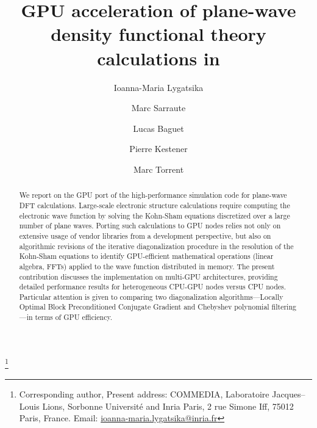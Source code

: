 \documentclass[twocolumn,superscriptaddress]{revtex4-1}
\begin{document}
\title{GPU acceleration of plane-wave density functional theory calculations in \abinit}

\author{Ioanna-Maria Lygatsika}
\thanks{Corresponding author, Present address: COMMEDIA, Laboratoire Jacques–Louis Lions, Sorbonne Universit\'e and Inria Paris, 2 rue Simone Iff, 75012
Paris, France. Email: \href{mailto:ioanna-maria.lygatsika@inria.fr}{ioanna-maria.lygatsika@inria.fr}}

\author{Marc Sarraute}

\author{Lucas Baguet}

\author{Pierre Kestener}

\author{Marc Torrent}

\begin{abstract}

We report on the GPU port of the \abinit high-performance simulation code for plane-wave DFT calculations. Large-scale electronic structure calculations require computing the electronic wave function by solving the Kohn-Sham equations discretized over a large number of plane waves. Porting such calculations to GPU nodes relies not only on extensive usage of vendor libraries from a development perspective, but also on algorithmic revisions of the iterative diagonalization procedure in the resolution of the Kohn-Sham equations to identify GPU-efficient mathematical operations (linear algebra, FFTs) applied to the wave function distributed in memory. The present contribution discusses the \abinit implementation on multi-GPU architectures, providing detailed performance results for heterogeneous CPU-GPU nodes versus CPU nodes. Particular attention is given to comparing two diagonalization algorithms---Locally Optimal Block Preconditioned Conjugate Gradient and Chebyshev polynomial filtering---in terms of GPU efficiency.

\end{abstract}
\end{document}

